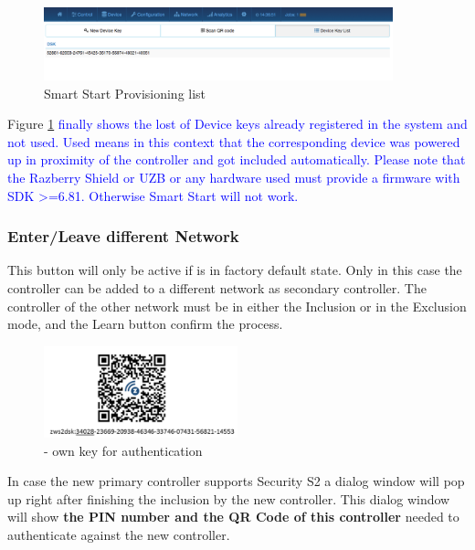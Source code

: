 \begin{figure}
\begin{center}
\includegraphics[width=0.9\textwidth]{pngs/cap7/ss3.png}
\caption{Smart Start Provisioning list}
\label{ss3}
\end{center}
\end{figure}

Figure \ref{ss3} \textcolor{blue}{finally shows the lost of Device keys already registered 
in the system and not used. Used means in this context that the corresponding device
was powered up in proximity of the controller and got included automatically. Please note that
the Razberry Shield or UZB or any hardware used must provide a firmware with SDK >=6.81. 
Otherwise Smart Start will not work.}



\subsubsection{Enter/Leave different Network}


This button will only be active if \zway is in factory default state. Only in this case 
the controller can be added to a different network as secondary controller. The controller 
of the other network must be in either the Inclusion or in the Exclusion mode, and the 
Learn button confirm the process.


\begin{figure}
\begin{center}
\includegraphics[width=0.5\textwidth]{pngs/cap7/security2_5.png}
\caption{\zway -  own key for authentication}
\label{security2_5}
\end{center}
\end{figure}

In case the new primary controller supports Security S2 a dialog window 
will pop up right after finishing the inclusion by the new controller. This dialog window 
will show \textbf{the PIN number and the QR Code of this \zway controller} needed to authenticate 
against the new controller.


